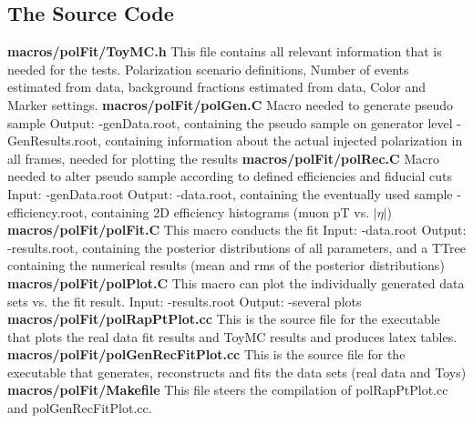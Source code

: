 \documentclass{article}
\begin{document}
\subsection{The Source Code}

{\bf macros/polFit/ToyMC.h}
This file contains all relevant information that is needed for the tests. Polarization scenario
definitions, Number of events estimated from data, background fractions estimated from data,
Color and Marker settings.
\newline
\newline
{\bf macros/polFit/polGen.C}
Macro needed to generate pseudo sample 
\newline Output:
\newline-genData.root, containing the pseudo sample on generator level
\newline-GenResults.root, containing information about the actual injected polarization in all frames,
needed for plotting the results
\newline
\newline
{\bf macros/polFit/polRec.C}
Macro needed to alter pseudo sample according to defined efficiencies and fiducial cuts
\newline Input:
\newline-genData.root
\newline Output:
\newline-data.root, containing the eventually used sample
\newline-efficiency.root, containing 2D efficiency histograms (muon pT vs. $|\eta|$)
\newline
\newline
{\bf macros/polFit/polFit.C}
This macro conducts the fit 
\newline Input:
\newline-data.root
\newline Output:
\newline-results.root, containing the posterior distributions of all parameters, and a TTree containing the
numerical results (mean and rms of the posterior distributions)
\newline
\newline
{\bf macros/polFit/polPlot.C}
This macro can plot the individually generated data sets vs. the fit result.
\newline Input:
\newline-results.root
\newline Output:
\newline-several plots
\newline
\newline
{\bf macros/polFit/polRapPtPlot.cc}
This is the source file for the executable that plots the real data fit results and ToyMC results and produces latex tables.
\newline
\newline
{\bf macros/polFit/polGenRecFitPlot.cc}
This is the source file for the executable that generates, reconstructs and fits the data sets (real data and Toys)
\newline
\newline
{\bf macros/polFit/Makefile}
This file steers the compilation of polRapPtPlot.cc and polGenRecFitPlot.cc.
\newline
\newline
\end{document}
